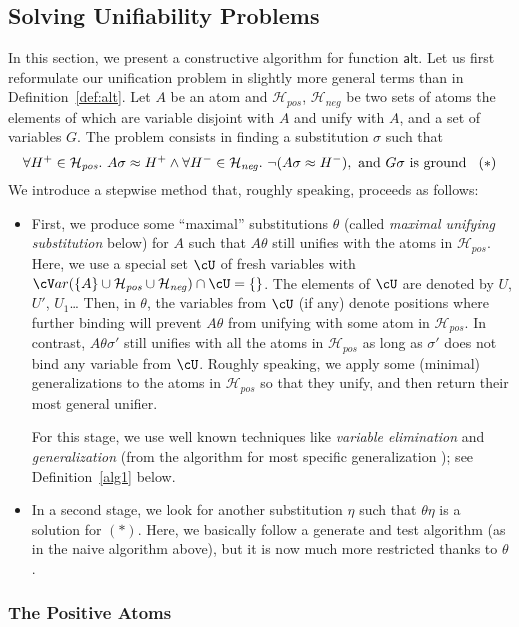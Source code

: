 \documentclass[fleqn]{tlp}
\newcommand{\alt}{\mathsf{alt}}
\newcommand{\var}{{\cV}ar}
\newcommand{\Hpos}{\mathcal{H}_{\mathit{pos}}}
\newcommand{\Hneg}{\mathcal{H}_{\mathit{neg}}}
\begin{document}
\subsection{Solving Unifiability Problems} \label{sec:unif}

In this section, we present a constructive algorithm for function $\alt$.
Let us first reformulate our unification problem in slightly more
general terms than in Definition~\ref{def:alt}. Let $A$ be an atom and
$\Hpos$, $\Hneg$ be two sets of atoms the elements of which are
variable disjoint with $A$ and unify with $A$, and a set of variables
$G$. The problem consists in finding a substitution $\sigma$ such that
\[
\forall H^+\in\Hpos.~
A\sigma\approx H^+ \wedge 
\forall H^-\in\Hneg.~
\neg (A\sigma\approx H^-),~\mbox{and}~ G\sigma ~\mbox{is ground}\hspace{2ex}(*)
\]
We introduce a stepwise method that, roughly speaking, proceeds as
follows:
\begin{itemize}
\item First, we produce some ``maximal'' substitutions $\theta$
  (called \emph{maximal unifying substitution} below) for $A$ such
  that $A\theta$ still unifies with the atoms in $\Hpos$. Here, we use
  a special set $\cU$ of fresh variables with
  $\var(\{A\}\cup\Hpos\cup\Hneg)\cap\cU=\emptyset$. The elements of
  $\cU$ are denoted by $U$, $U'$, $U_1$\dots{} Then, in $\theta$, the
  variables from $\cU$ (if any) denote positions where further binding
  will prevent $A\theta$ from unifying with some atom in $\Hpos$. In
  contrast, $A\theta\sigma'$ still unifies with all the atoms in
  $\Hpos$ as long as $\sigma'$ does not bind any variable from $\cU$.
Roughly speaking, we apply some (minimal) generalizations to the
  atoms in $\Hpos$ so that they unify, and then return their most
  general unifier.

  For this stage, we use well known techniques like \emph{variable
    elimination} \cite{MM82}
  and \emph{generalization} (from the algorithm for most specific
  generalization \cite{Plo70}); see Definition~\ref{alg1} below.

\item In a second stage, we look for another substitution $\eta$
  such that $\theta\eta$ is a solution for $(*)$. Here, we
  basically follow a generate and test algorithm (as in the naive
  algorithm above), but it is now much more restricted thanks to
  $\theta$.
\end{itemize}

\subsubsection{The Positive Atoms}
\label{section-algo-all-pos}
\end{document}
